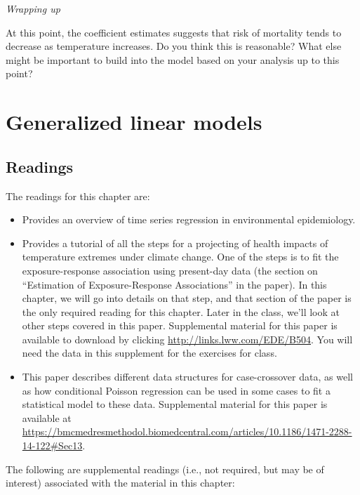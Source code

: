 \documentclass[
]{book}
\providecommand{\tightlist}{%
  \setlength{\itemsep}{0pt}\setlength{\parskip}{0pt}}
\begin{document}
\emph{Wrapping up}

At this point, the coefficient estimates suggests that risk of mortality
tends to decrease as temperature increases. Do you think this is reasonable?
What else might be important to build into the model based on your analysis
up to this point?

\hypertarget{generalized-linear-models}{%
\chapter{Generalized linear models}\label{generalized-linear-models}}

\hypertarget{readings-1}{%
\section{Readings}\label{readings-1}}

The readings for this chapter are:

\begin{itemize}
\tightlist
\item
  \citet{bhaskaran2013time} Provides an overview of time series regression
  in environmental epidemiology.
\item
  \citet{vicedo2019hands} Provides a tutorial of all the steps for a
  projecting of health impacts of temperature extremes under climate change.
  One of the steps is to fit the exposure-response association using present-day data
  (the section on ``Estimation of Exposure-Response Associations'' in the paper).
  In this chapter, we will go into details on that step, and that section of the paper
  is the only required reading for this chapter. Later in the class, we'll
  look at other steps covered in this paper. Supplemental material for this paper is
  available to download by
  clicking \url{http://links.lww.com/EDE/B504}. You will need the data in this supplement
  for the exercises for class.
\item
  \citet{armstrong2014conditional} This paper describes different data structures for
  case-crossover data, as well as how conditional Poisson regression can be used
  in some cases to fit a statistical model to these data.
  Supplemental material for this paper is available at
  \url{https://bmcmedresmethodol.biomedcentral.com/articles/10.1186/1471-2288-14-122\#Sec13}.
\end{itemize}

The following are supplemental readings (i.e., not required, but may be of
interest) associated with the material in this chapter:
\end{document}
